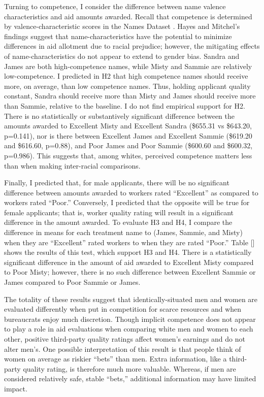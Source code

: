 \documentclass[12pt]{article}%
\begin{document}
\begin{doublespace}
Turning to competence, I consider the difference between name valence characteristics and aid amounts awarded. Recall that competence is determined by valence-characteristic scores in the Names Dataset \citep{hayes_2020}. Hayes and Mitchel’s findings suggest that name-characteristics have the potential to minimize differences in aid allotment due to racial prejudice; however, the mitigating effects of name-characteristics do not appear to extend to gender bias. Sandra and James are both high-competence names, while Misty and Sammie are relatively low-competence. I predicted in H2 that high competence names should receive more, on average, than low competence names. Thus, holding applicant quality constant, Sandra should receive more than Misty and James should receive more than Sammie, relative to the baseline. I do not find empirical support for H2. There is no statistically or substantively significant difference between the amounts awarded to Excellent Misty and Excellent Sandra (\$655.31 vs \$643.20, p=0.141), nor is there between Excellent James and Excellent Sammie (\$619.20 and \$616.60, p=0.88), and Poor James and Poor Sammie (\$600.60 and \$600.32, p=0.986). This suggests that, among whites, perceived competence matters less than when making inter-racial comparisons.

Finally, I predicted that, for male applicants, there will be no significant difference between amounts awarded to workers rated ``Excellent” as compared to workers rated ``Poor.” Conversely, I predicted that the opposite will be true for female applicants; that is, worker quality rating will result in a significant difference in the amount awarded. To evaluate H3 and H4, I compare the difference in means for each treatment name to (James, Sammie, and Misty) when they are ``Excellent” rated workers to when they are rated ``Poor.” Table [] shows the results of this test, which support H3 and H4. There is a statistically significant difference in the amount of aid awarded to Excellent Misty compared to Poor Misty; however, there is no such difference between Excellent Sammie or James compared to Poor Sammie or James.


The totality of these results suggest that identically-situated men and women are evaluated differently when put in competition for scarce resources and when bureaucrats enjoy much discretion. Though implicit competence does not appear to play a role in aid evaluations when comparing white men and women to each other, positive third-party quality ratings affect women’s earnings and do not alter men’s. One possible interpretation of this result is that people think of women on average as riskier ``bets” than men. Extra information, like a third-party quality rating, is therefore much more valuable. Whereas, if men are considered relatively safe, stable ``bets,” additional information may have limited impact.


\end{doublespace}
\end{document}
